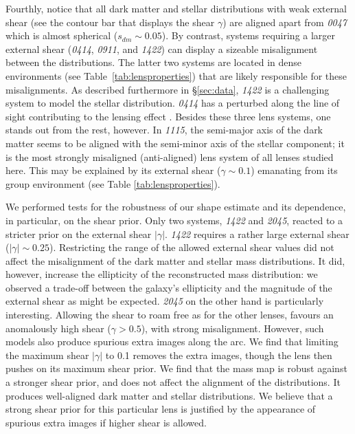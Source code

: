 \documentclass[useAMS,usenatbib]{mn2e}
\begin{document}
Fourthly, notice that all dark matter and stellar distributions with weak external shear (see the contour bar that displays the shear $\gamma$) are aligned apart from {\it0047} which is almost spherical ($s_{dm}\sim0.05$). By contrast, systems requiring a larger external shear ({\it0414}, {\it0911}, and {\it1422}) can display a sizeable misalignment between the distributions. The latter two systems are located in dense environments (see Table~\ref{tab:lensproperties}) that are likely responsible for these misalignments. As described furthermore in \S\ref{sec:data}, {\it1422} is a challenging system to model the stellar distribution. {\it0414} has a perturbed along the line of sight contributing to the lensing effect \citep{2011MNRAS.413L..86C}. Besides these three lens systems, one stands out from the rest, however. In {\it1115}, the semi-major axis of the dark matter seems to be aligned with the semi-minor axis of the stellar component; it is the most strongly misaligned (anti-aligned) lens system of all lenses studied here. This may be explained by its external shear ($\gamma \sim 0.1$) emanating from its group environment (see Table \ref{tab:lensproperties}).

We performed tests for the robustness of our shape estimate and its dependence, in particular, on the shear prior. Only two systems, {\it1422} and {\it2045}, reacted to a stricter prior on the external shear $|\gamma|$. {\it1422} requires a rather large external shear ($|\gamma|\sim0.25$). Restricting the range of the allowed external shear values did not affect the misalignment of the dark matter and stellar mass distributions. It did, however, increase the ellipticity of the reconstructed mass distribution: we observed a trade-off between the galaxy's ellipticity and the magnitude of the external shear as might be expected. {\it2045} on the other hand is particularly interesting. Allowing the shear to roam free as for the other lenses, favours an anomalously high shear ($\gamma > 0.5$), with strong misalignment. However, such models also produce spurious extra images along the arc. We find that limiting the maximum shear $|\gamma|$ to 0.1 removes the extra images, though the lens then pushes on its maximum shear prior. We find that the mass map is robust against a stronger shear prior, and does not affect the alignment of the distributions. It produces well-aligned dark matter and stellar distributions. We believe that a strong shear prior for this particular lens is justified by the appearance of spurious extra images if higher shear is allowed.
\end{document}
